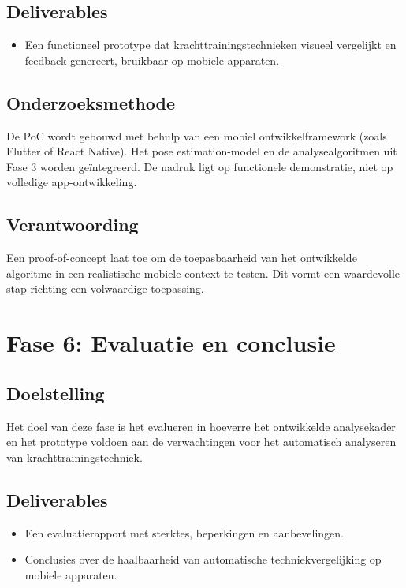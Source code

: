 \subsection{Deliverables}
\begin{itemize}
    \item Een functioneel prototype dat krachttrainingstechnieken visueel vergelijkt en feedback genereert, bruikbaar op mobiele apparaten.
\end{itemize}

\subsection{Onderzoeksmethode}
De PoC wordt gebouwd met behulp van een mobiel ontwikkelframework (zoals Flutter of React Native). 
Het pose estimation-model en de analysealgoritmen uit Fase 3 worden geïntegreerd. 
De nadruk ligt op functionele demonstratie, niet op volledige app-ontwikkeling.

\subsection{Verantwoording}
Een proof-of-concept laat toe om de toepasbaarheid van het ontwikkelde algoritme in een realistische mobiele context te testen. 
Dit vormt een waardevolle stap richting een volwaardige toepassing.

\section{Fase 6: Evaluatie en conclusie}
\subsection{Doelstelling}
Het doel van deze fase is het evalueren in hoeverre het ontwikkelde analysekader en het prototype voldoen aan de verwachtingen voor het automatisch analyseren van krachttrainingstechniek.

\subsection{Deliverables}
\begin{itemize}
    \item Een evaluatierapport met sterktes, beperkingen en aanbevelingen.
    \item Conclusies over de haalbaarheid van automatische techniekvergelijking op mobiele apparaten.
\end{itemize}

